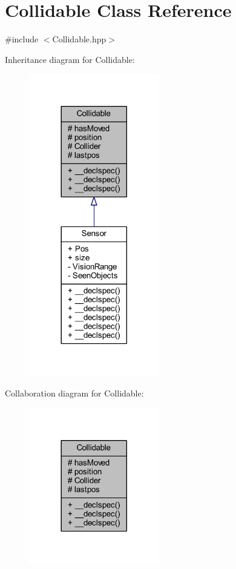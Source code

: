 \hypertarget{class_collidable}{\section{Collidable Class Reference}
\label{class_collidable}
}


{\ttfamily \#include $<$Collidable.\-hpp$>$}



Inheritance diagram for Collidable\-:\nopagebreak
\begin{figure}[H]
\begin{center}
\leavevmode
\includegraphics[width=161pt]{class_collidable__inherit__graph}
\end{center}
\end{figure}


Collaboration diagram for Collidable\-:\nopagebreak
\begin{figure}[H]
\begin{center}
\leavevmode
\includegraphics[width=161pt]{class_collidable__coll__graph}
\end{center}
\end{figure}
